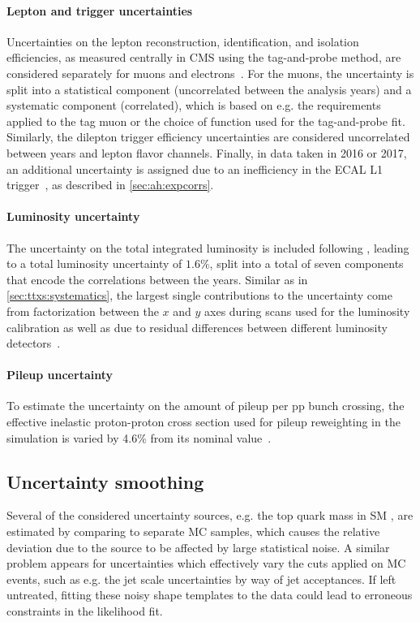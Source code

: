 \paragraph{Lepton and trigger uncertainties}
Uncertainties on the lepton reconstruction, identification, and isolation efficiencies, as measured centrally in CMS using the tag-and-probe method, are considered separately for muons and electrons~\cite{CMS:EGM-17-001,CMS:MUO-16-001}. For the muons, the uncertainty is split into a statistical component (uncorrelated between the analysis years) and a systematic component (correlated), which is based on e.g. the requirements applied to the tag muon or the choice of function used for the tag-and-probe fit. Similarly, the dilepton trigger efficiency uncertainties are considered uncorrelated between years and lepton flavor channels. Finally, in data taken in 2016 or 2017, an additional uncertainty is assigned due to an inefficiency in the ECAL L1 trigger~\cite{CMS:TRG-17-001}, as described in \cref{sec:ah:expcorrs}.

\paragraph{Luminosity uncertainty}
The uncertainty on the total integrated luminosity is included following , leading to a total luminosity uncertainty of $1.6\%$, split into a total of seven components that encode the correlations between the years. Similar as in \cref{sec:ttxs:systematics}, the largest single contributions to the uncertainty come from factorization between the $x$ and $y$ axes during scans used for the luminosity calibration as well as due to residual differences between different luminosity detectors~\cite{CMS:LUM-17-003}. 

\paragraph{Pileup uncertainty}
To estimate the uncertainty on the amount of pileup per pp bunch crossing, the effective inelastic proton-proton cross section used for pileup reweighting in the simulation is varied by 4.6\% from its nominal value~\cite{CMS:FSQ-15-005}.

\subsection{Uncertainty smoothing}
Several of the considered uncertainty sources, e.g. the top quark mass in SM \ttbar, are estimated by comparing to separate MC samples, which causes the relative deviation due to the source to be affected by large statistical noise. A similar problem appears for uncertainties which effectively vary the cuts applied on MC events, such as e.g. the jet \pt scale uncertainties by way of jet acceptances. If left untreated, fitting these noisy shape templates to the data could lead to erroneous constraints in the likelihood fit. 

